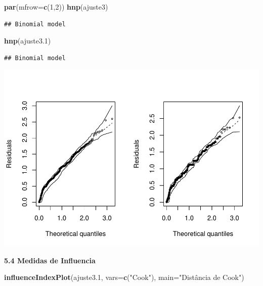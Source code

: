 \documentclass[]{article}
\newenvironment{Shaded}{\begin{snugshade}}{\end{snugshade}}
\newcommand{\KeywordTok}[1]{\textcolor[rgb]{0.13,0.29,0.53}{\textbf{{#1}}}}
\newcommand{\DataTypeTok}[1]{\textcolor[rgb]{0.13,0.29,0.53}{{#1}}}
\newcommand{\DecValTok}[1]{\textcolor[rgb]{0.00,0.00,0.81}{{#1}}}
\newcommand{\FloatTok}[1]{\textcolor[rgb]{0.00,0.00,0.81}{{#1}}}
\newcommand{\StringTok}[1]{\textcolor[rgb]{0.31,0.60,0.02}{{#1}}}
\newcommand{\NormalTok}[1]{{#1}}
\begin{document}
\begin{Shaded}
\begin{Highlighting}[]
\KeywordTok{par}\NormalTok{(}\DataTypeTok{mfrow=}\KeywordTok{c}\NormalTok{(}\DecValTok{1}\NormalTok{,}\DecValTok{2}\NormalTok{))}
\KeywordTok{hnp}\NormalTok{(ajuste3)}
\end{Highlighting}
\end{Shaded}

\begin{verbatim}
## Binomial model
\end{verbatim}

\begin{Shaded}
\begin{Highlighting}[]
\KeywordTok{hnp}\NormalTok{(ajuste3}\FloatTok{.1}\NormalTok{)}
\end{Highlighting}
\end{Shaded}

\begin{verbatim}
## Binomial model
\end{verbatim}

\includegraphics{Dados_Binários1_files/figure-latex/unnamed-chunk-16-3.pdf}

\textbf{5.4 Medidas de Influencia}

\begin{Shaded}
\begin{Highlighting}[]
\KeywordTok{influenceIndexPlot}\NormalTok{(ajuste3}\FloatTok{.1}\NormalTok{, }\DataTypeTok{vars=}\KeywordTok{c}\NormalTok{(}\StringTok{"Cook"}\NormalTok{), }\DataTypeTok{main=}\StringTok{"Distância de Cook"}\NormalTok{)}
\end{Highlighting}
\end{Shaded}
\end{document}
